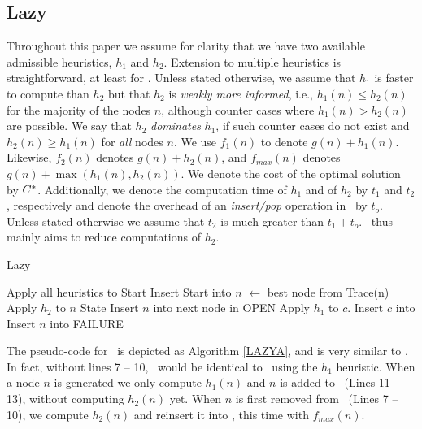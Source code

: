 \subsection{Lazy \astar}

Throughout this paper we assume for clarity that we have two available admissible heuristics, $h_1$ and $h_2$.
Extension to multiple heuristics is straightforward, at least for \lazyastar.
Unless stated otherwise, we assume that $h_1$ is faster to compute than $h_2$
but that $h_2$ is {\em weakly more informed}, i.e., $h_1(n) \leq h_2(n)$ for
the majority of the nodes $n$, although counter cases where $h_1(n) > h_2(n)$
are possible.
We say that $h_2$ {\em dominates} $h_1$, if such counter cases do not
exist and $h_2(n) \geq h_1(n)$ for {\em all} nodes $n$.
We use $f_1(n)$ to denote $g(n)+h_1(n)$. Likewise, $f_2(n)$
denotes $g(n)+h_2(n)$, and $f_{max}(n)$ denotes $g(n) + \max(h_1(n),h_2(n))$.
We denote the cost of the optimal solution by $C^\ast$. Additionally, we
denote the computation time of $h_1$ and of $h_2$ by $t_1$ and $t_2$,
respectively and denote the overhead of an {\em insert/pop} operation in
\OPEN~by $t_o$. Unless stated otherwise we assume that $t_2$ is much greater
than $t_1 + t_o$. \lazyastar~thus mainly aims to reduce computations of $h_2$.

\begin{algorithm}[h]
\caption{Lazy \astar}
\begin{algorithmic}[1]
    \State Apply all heuristics to Start
    \State Insert Start into \OPEN
        \State $n$ $\gets$ best node from \OPEN
            \Return Trace(n)
        \EndIf
            \State Apply $h_2$ to $n$
            State Insert $n$ into \OPEN
			 \Comment next node in OPEN
        \EndIf
            \State Apply $h_1$ to $c$.
            \State Insert $c$ into \OPEN
        \EndFor
        \State Insert $n$ into \CLOSED
    \EndWhile
    \Return FAILURE
\EndProcedure
\end{algorithmic}
\label{LAZYA}
\end{algorithm}

The pseudo-code for  \lazyastar~is depicted as Algorithm \ref{LAZYA}, and is
very similar to \astar.
In fact, without lines 7 -- 10, \lazyastar~would be identical to
\astar~using the $h_1$ heuristic.
When a node $n$ is generated we only compute $h_1(n)$ and $n$ is added to
\OPEN ~(Lines 11 -- 13), without computing $h_2(n)$ yet.
When $n$ is first removed from \OPEN~(Lines 7 -- 10), we compute $h_2(n)$ and
reinsert it into \OPEN, this time with $f_{max}(n)$.%

